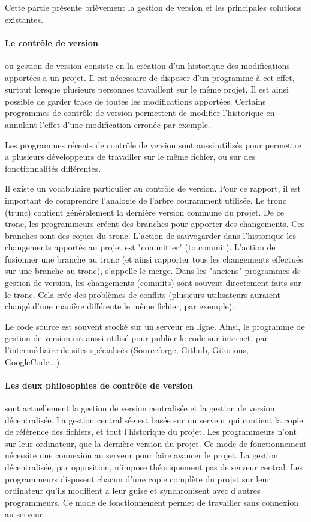 Cette partie présente brièvement la gestion de version et les principales solutions existantes.

\paragraph{Le contrôle de version} ou gestion de version consiste en
la création d'un historique des modifications apportées a un projet.
Il est nécessaire de disposer d'un programme à cet effet,
surtout lorsque plusieurs personnes travaillent sur le même projet.
Il est ainsi possible de garder trace de toutes les modifications apportées.
Certains programmes de contrôle de version permettent
de modifier l'historique en annulant l'effet d'une modification erronée par exemple.

Les programmes récents de contrôle de version sont aussi utilisés
pour permettre a plusieurs développeurs de travailler 
sur le même fichier, ou sur des fonctionnalités différentes.

Il existe un vocabulaire particulier au contrôle de version.
Pour ce rapport, il est important de comprendre l'analogie de l'arbre couramment utilisée.
Le tronc (trunc) contient généralement la dernière version commune du projet.
De ce tronc, les programmeurs créent des branches pour apporter des changements.
Ces branches sont des copies du tronc.
L'action de sauvegarder dans l'historique les changements apportés au projet est "committer" (to commit).
L'action de fusionner une branche au tronc
(et ainsi rapporter tous les changements effectués sur une branche au tronc), s'appelle le merge.
Dans les  "anciens" programmes de gestion de version,
les changements (commits) sont souvent directement faits sur le tronc.
Cela crée des problèmes de conflits
(plusieurs utilisateurs auraient changé d'une manière différente le même fichier, par exemple).

Le code source est souvent stocké sur un serveur en ligne.
Ainsi, le programme de gestion de version est aussi utilisé
pour publier le code sur internet, par l'intermédiaire de sites spécialisés
(Sourceforge, Github, Gitorious, GoogleCode...).



\paragraph{Les deux philosophies de contrôle de version} sont actuellement la gestion de version centralisée et la gestion de version décentralisée. 
La gestion centralisée est basée sur un serveur qui contient la copie de référence des fichiers, 
et tout l'historique du projet. 
Les programmeurs n'ont sur leur ordinateur, que la dernière version du projet. 
Ce mode de fonctionnement nécessite une connexion au serveur pour faire avancer le projet.
La gestion décentralisée, par opposition, n'impose théoriquement pas de serveur central.
Les programmeurs disposent chacun d'une copie complète du projet sur leur ordinateur
qu'ils modifient a leur guise et synchronisent avec d'autres programmeurs.
Ce mode de fonctionnement permet de travailler sans connexion au serveur.

